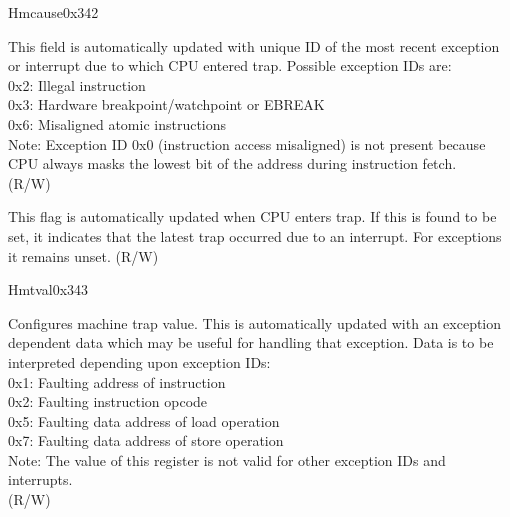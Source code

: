 \begin{register}{H}{mcause}{0x342}\label{regdesc:LPMCAUSE}
%
%
%
\regnewline%
\begin{regdesc}\begin{reglist}
\label{fielddesc:LPMCAUSECODE}\item [Exception Code] This field is automatically updated with unique ID of the most recent exception or interrupt due to which CPU entered trap. Possible exception IDs are:\\
0x2: Illegal instruction\\
0x3: Hardware breakpoint/watchpoint or EBREAK\\
0x6: Misaligned atomic instructions\\
Note: Exception ID 0x0 (instruction access misaligned) is not present because CPU always masks the lowest bit of the address during instruction fetch.\\
(R/W)
\label{fielddesc:LPMCAUSEINT}\item [Interrupt Flag] This flag is automatically updated when CPU enters trap. If this is found to be set, it indicates that the latest trap occurred due to an interrupt. For exceptions it remains unset.  (R/W)
\end{reglist}\end{regdesc}
\end{register}

\begin{register}{H}{mtval}{0x343}\label{regdesc:LPMTVAL}
%
\regnewline%
\begin{regdesc}\begin{reglist}
\label{fielddesc:LPMTVAL}\item [MTVAL] Configures machine trap value. This is automatically updated with an exception dependent data which may be useful for handling that exception. Data is to be interpreted depending upon exception IDs:\\
0x1: Faulting address of instruction\\
0x2: Faulting instruction opcode\\
0x5: Faulting data address of load operation\\
0x7: Faulting data address of store operation\\
Note: The value of this register is not valid for other exception IDs and interrupts.\\
(R/W)
\end{reglist}\end{regdesc}
\end{register}


